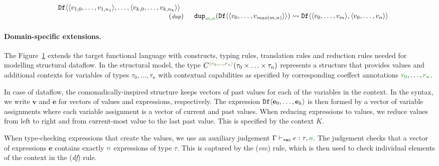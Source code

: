 \begin{figure}[t]
\begin{equation*}
\begin{array}{rl}
\begin{array}{l}
\\[-0.25em]
\quad \ident{Df}\langle\langle v_{1,0}, \ldots, v_{1, n_1} \rangle,\ldots,\langle v_{k,0}, \ldots, v_{k, n_k} \rangle\rangle
\end{array}
\\[0.25em]
{\footnotesize(\emph{dup})} & \begin{array}{l}
\ident{dup}_{\cclrd{m},\cclrd{n}} (\ident{Df}\langle\langle v_0, \ldots, v_{\mathit{max}(m,n)} \rangle\rangle) \rightsquigarrow
  \ident{Df}\langle\langle v_0, \ldots, v_m \rangle, \langle v_0, \ldots, v_n \rangle\rangle
\end{array}
\end{array}
\end{equation*}

\label{fig:structural-ext-df}
\end{figure}


\paragraph{Domain-specific extensions.}

The Figure~\ref{fig:structural-ext-df} extends the target functional language with constructs,
typing rules, translation rules and reduction rules needed for modelling structural dataflow.
In the structural model, the type $\ctyp{\alift{\cclrd{r_0}, \ldots, \cclrd{r_n}}}{(\tau_0\times\ldots\times\tau_n)}$
represents a structure that provides values and additional contexts for variables of types
$\tau_0,\ldots,\tau_n$ with contextual capabilities as specified by corresponding coeffect annotations
$\cclrd{r_0}, \ldots, \cclrd{r_n}$.

In case of dataflow, the comonadically-inspired structure keeps vectors of past values for each of
the variables in the context. In the syntax, we write $\textbf{v}$ and $\textbf{e}$ for vectors of
values and expressions, respectively. The expression $\textnormal{\ttfamily Df}\langle \textbf{e}_0, \ldots, \textbf{e}_k \rangle$
is then formed by a vector of variable assignments where each variable assignment is a vector
of current and past values. When reducing expressions to values, we reduce values from left to
right and from current-most value to the last past value. This is specified by the context $K$.

When type-checking expressions that create the  values, we use an auxiliary judgement
$\Gamma \vdash_{\ident{vec}} e : \tau, \cclrd{n}$. The judgement checks that a vector of expressions
$\textbf{e}$ contains exactly $\cclrd{n}$ expressions of type $\tau$. This is captured by the
(\emph{vec}) rule, which is then used to check individual elements of the context in the
(\emph{df}) rule.

